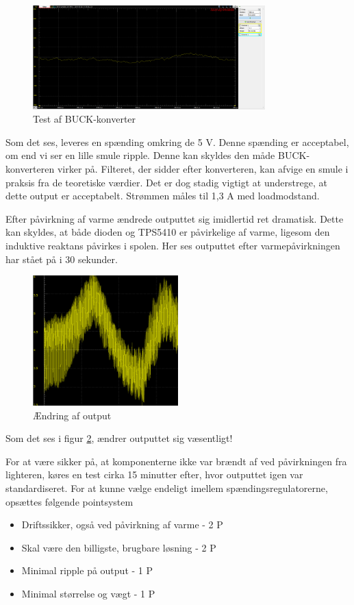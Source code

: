 \begin{figure}[h]
  \centering
  \includegraphics[width=0.8\textwidth]{./figurer/j10.png}
  \caption{Test af BUCK-konverter}
  \label{fig:j10}
\end{figure}

Som det ses, leveres en spænding omkring de 5 V. Denne spænding er acceptabel, om end vi ser en lille smule ripple. Denne kan skyldes den måde BUCK-konverteren virker på. Filteret, der sidder efter konverteren, kan afvige en smule i praksis fra de teoretiske værdier. Det er dog stadig vigtigt at understrege, at dette output er acceptabelt. Strømmen måles til 1,3 A med loadmodstand.

Efter påvirkning af varme ændrede outputtet sig imidlertid ret dramatisk. Dette kan skyldes, at både dioden og TPS5410 er påvirkelige af varme, ligesom den induktive reaktans påvirkes i spolen. Her ses outputtet efter varmepåvirkningen har stået på i 30 sekunder. 

\begin{figure}[h]
  \centering
  \includegraphics[width=0.5\textwidth]{./figurer/j11.png}
  \caption{Ændring af output}
  \label{fig:j11}
\end{figure}


Som det ses i figur \ref{fig:j11}, ændrer outputtet sig væsentligt! 

For at være sikker på, at komponenterne ikke var brændt af ved påvirkningen fra lighteren, køres en test cirka 15 minutter efter, hvor outputtet igen var standardiseret. 
\vspace{0.3cm}
For at kunne vælge endeligt imellem spændingsregulatorerne, opsættes følgende pointsystem
\begin{itemize}
\item Driftssikker, også ved påvirkning af varme - 2 P
\item Skal være den billigste, brugbare løsning - 2 P
\item Minimal ripple på output - 1 P
\item Minimal størrelse og vægt - 1 P
\end{itemize}

